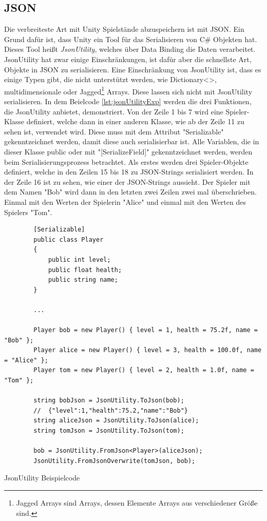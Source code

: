 \subsection{JSON}
Die verbreiteste Art mit Unity Spielstände abzuspeichern ist mit JSON. Ein Grund dafür ist, dass Unity ein Tool für das Serialisieren von C\# Objekten hat. Dieses Tool heißt \textit{JsonUtility}, welches über Data Binding die Daten verarbeitet. JsonUtility hat zwar einige Einschränkungen, ist dafür aber die schnellste Art, Objekte in JSON zu serialisieren. Eine Einschränkung von JsonUtility ist, dass es einige Typen gibt, die nicht unterstützt werden, wie Dictionary<>, multidimensionale oder Jagged\footnote{Jagged Arrays sind Arrays, dessen Elemente Arrays aus verschiedener Größe sind.\cite{microsoftVerzweigteArrays}} Arrays. Diese lassen sich nicht mit JsonUtility serialisieren. In dem Beielcode \ref{lst:jsonUtilityExp} werden die drei Funktionen, die JsonUtility anbietet, demonstriert. Von der Zeile 1 bis 7 wird eine Spieler-Klasse definiert, welche dann in einer anderen Klasse, wie ab der Zeile 11 zu sehen ist, verwendet wird. Diese muss mit dem Attribut "Serializable" gekenntzeichnet werden, damit diese auch serialisierbar ist. Alle Variablen, die in dieser Klasse public oder mit "[SerializeField]" gekenntzeichnet werden, werden beim Serialisierungsprozess betrachtet. Als erstes werden drei Spieler-Objekte definiert, welche in den Zeilen 15 bis 18 zu JSON-Strings serialisiert werden. In der Zeile 16 ist zu sehen, wie einer der JSON-Strings aussieht. Der Spieler mit dem Namen "Bob" wird dann in den letzten zwei Zeilen zwei mal überschrieben. Einmal mit den Werten der Spielerin "Alice" und einmal mit den Werten des Spielers "Tom". 
\cite{unityJsonUtility}\cite{unitySerializationRules} 
\begin{listing}[htp]
    \begin{verbatim} 
        [Serializable]
        public class Player
        {
            public int level;
            public float health;
            public string name;
        }

        ...
        
        Player bob = new Player() { level = 1, health = 75.2f, name = "Bob" };
        Player alice = new Player() { level = 3, health = 100.0f, name = "Alice" };
        Player tom = new Player() { level = 2, health = 1.0f, name = "Tom" };

        string bobJson = JsonUtility.ToJson(bob);
        //  {"level":1,"health":75.2,"name":"Bob"}
        string aliceJson = JsonUtility.ToJson(alice);
        string tomJson = JsonUtility.ToJson(tom);

        bob = JsonUtility.FromJson<Player>(aliceJson);
        JsonUtility.FromJsonOverwrite(tomJson, bob);
    \end{verbatim}
    \caption{JsonUtility Beispielcode}
    \label{lst:jsonUtilityExp}
\end{listing}

